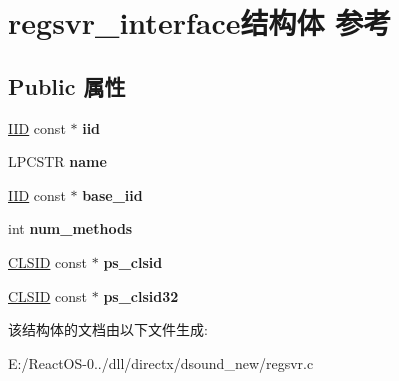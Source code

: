 \hypertarget{structregsvr__interface}{}\section{regsvr\+\_\+interface结构体 参考}
\label{structregsvr__interface}
\subsection*{Public 属性}
\begin{DoxyCompactItemize}
\item 
\mbox{\label{structregsvr__interface_a9641d3e348ec1406a42c69bb9ddf1c2d}} 
\hyperlink{struct___i_i_d}{I\+ID} const  $\ast$ {\bfseries iid}
\item 
\mbox{\label{structregsvr__interface_a81786ff3cf99e73e3ea97ea91a07bf8c}} 
L\+P\+C\+S\+TR {\bfseries name}
\item 
\mbox{\label{structregsvr__interface_a4acff7ad03b839a116be2a47d26b6f5e}} 
\hyperlink{struct___i_i_d}{I\+ID} const  $\ast$ {\bfseries base\+\_\+iid}
\item 
\mbox{\label{structregsvr__interface_ad630c6e29af28691dbbd5ce8e34268eb}} 
int {\bfseries num\+\_\+methods}
\item 
\mbox{\label{structregsvr__interface_a34b51240138390572a4608e09d04df30}} 
\hyperlink{struct___i_i_d}{C\+L\+S\+ID} const  $\ast$ {\bfseries ps\+\_\+clsid}
\item 
\mbox{\label{structregsvr__interface_ab68ff83a00f910ec52b145707a603e6c}} 
\hyperlink{struct___i_i_d}{C\+L\+S\+ID} const  $\ast$ {\bfseries ps\+\_\+clsid32}
\end{DoxyCompactItemize}


该结构体的文档由以下文件生成\+:\begin{DoxyCompactItemize}
\item 
E\+:/\+React\+O\+S-\/0../dll/directx/dsound\+\_\+new/regsvr.\+c\end{DoxyCompactItemize}
